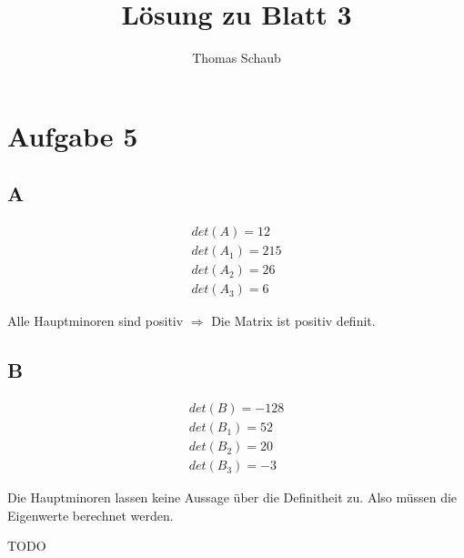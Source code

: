 \documentclass{scrartcl}
\title{Lösung zu Blatt 3}
\author{Thomas Schaub}
\begin{document}
\maketitle

\section{Aufgabe 5}

\subsection{A}

\begin{align*}
det(A) = 12 \\
det(A_1) = 215 \\
det(A_2) = 26 \\
det(A_3) = 6
\end{align*}

Alle Hauptminoren sind positiv $\Rightarrow$ Die Matrix ist positiv definit.

\subsection{B}

\begin{align*}
det(B) = -128 \\
det(B_1) = 52 \\
det(B_2) = 20 \\
det(B_3) = -3
\end{align*}

Die Hauptminoren lassen keine Aussage über die Definitheit zu. Also müssen die
Eigenwerte berechnet werden.

TODO
\end{document}
